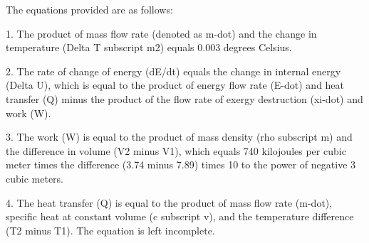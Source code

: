 The equations provided are as follows:

1. The product of mass flow rate (denoted as m-dot) and the change in temperature (Delta T subscript m2) equals 0.003 degrees Celsius.

2. The rate of change of energy (dE/dt) equals the change in internal energy (Delta U), which is equal to the product of energy flow rate (E-dot) and heat transfer (Q) minus the product of the flow rate of exergy destruction (xi-dot) and work (W).

3. The work (W) is equal to the product of mass density (rho subscript m) and the difference in volume (V2 minus V1), which equals 740 kilojoules per cubic meter times the difference (3.74 minus 7.89) times 10 to the power of negative 3 cubic meters.

4. The heat transfer (Q) is equal to the product of mass flow rate (m-dot), specific heat at constant volume (c subscript v), and the temperature difference (T2 minus T1). The equation is left incomplete.